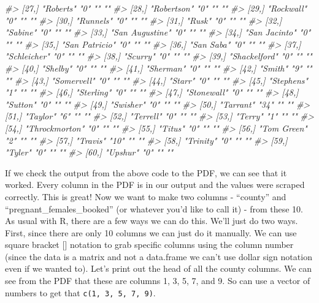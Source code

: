 \documentclass[
  12pt,
]{book}
\newenvironment{Shaded}{\begin{snugshade}}{\end{snugshade}}
\newcommand{\CommentTok}[1]{\textcolor[rgb]{0.56,0.35,0.01}{\textit{#1}}}
\begin{document}
\begin{Shaded}
\begin{Highlighting}[]
\CommentTok{\#> [27,] "Roberts"       "0"  ""              ""   }
\CommentTok{\#> [28,] "Robertson"     "0"  ""              ""   }
\CommentTok{\#> [29,] "Rockwall"      "0"  ""              ""   }
\CommentTok{\#> [30,] "Runnels"       "0"  ""              ""   }
\CommentTok{\#> [31,] "Rusk"          "0"  ""              ""   }
\CommentTok{\#> [32,] "Sabine"        "0"  ""              ""   }
\CommentTok{\#> [33,] "San Augustine" "0"  ""              ""   }
\CommentTok{\#> [34,] "San Jacinto"   "0"  ""              ""   }
\CommentTok{\#> [35,] "San Patricio"  "0"  ""              ""   }
\CommentTok{\#> [36,] "San Saba"      "0"  ""              ""   }
\CommentTok{\#> [37,] "Schleicher"    "0"  ""              ""   }
\CommentTok{\#> [38,] "Scurry"        "0"  ""              ""   }
\CommentTok{\#> [39,] "Shackelford"   "0"  ""              ""   }
\CommentTok{\#> [40,] "Shelby"        "0"  ""              ""   }
\CommentTok{\#> [41,] "Sherman"       "0"  ""              ""   }
\CommentTok{\#> [42,] "Smith"         "9"  ""              ""   }
\CommentTok{\#> [43,] "Somervell"     "0"  ""              ""   }
\CommentTok{\#> [44,] "Starr"         "0"  ""              ""   }
\CommentTok{\#> [45,] "Stephens"      "1"  ""              ""   }
\CommentTok{\#> [46,] "Sterling"      "0"  ""              ""   }
\CommentTok{\#> [47,] "Stonewall"     "0"  ""              ""   }
\CommentTok{\#> [48,] "Sutton"        "0"  ""              ""   }
\CommentTok{\#> [49,] "Swisher"       "0"  ""              ""   }
\CommentTok{\#> [50,] "Tarrant"       "34" ""              ""   }
\CommentTok{\#> [51,] "Taylor"        "6"  ""              ""   }
\CommentTok{\#> [52,] "Terrell"       "0"  ""              ""   }
\CommentTok{\#> [53,] "Terry"         "1"  ""              ""   }
\CommentTok{\#> [54,] "Throckmorton"  "0"  ""              ""   }
\CommentTok{\#> [55,] "Titus"         "0"  ""              ""   }
\CommentTok{\#> [56,] "Tom Green"     "2"  ""              ""   }
\CommentTok{\#> [57,] "Travis"        "10" ""              ""   }
\CommentTok{\#> [58,] "Trinity"       "0"  ""              ""   }
\CommentTok{\#> [59,] "Tyler"         "0"  ""              ""   }
\CommentTok{\#> [60,] "Upshur"        "0"  ""              ""}
\end{Highlighting}
\end{Shaded}

If we check the output from the above code to the PDF, we can see that it worked. Every column in the PDF is in our output and the values were scraped correctly. This is great! Now we want to make two columns - ``county'' and ``pregnant\_females\_booked'' (or whatever you'd like to call it) - from these 10. As usual with R, there are a few ways we can do this. We'll just do two ways. First, since there are only 10 columns we can just do it manually. We can use square bracket {[}{]} notation to grab specific columns using the column number (since the data is a matrix and not a data.frame we can't use dollar sign notation even if we wanted to). Let's print out the head of all the county columns. We can see from the PDF that these are columns 1, 3, 5, 7, and 9. So can use a vector of numbers to get that \texttt{c(1,\ 3,\ 5,\ 7,\ 9)}.
\end{document}
